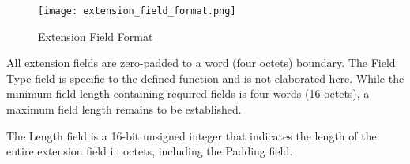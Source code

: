 \begin{figure}
\centering
\texttt{[image: extension\_field\_format.png]}
\caption{Extension Field Format}
\label{extension_field_format}
\end{figure}

All extension fields are zero-padded to a word (four octets)
boundary. The Field Type field is specific to the defined function
and is not elaborated here. While the minimum field length
containing required fields is four words (16 octets), a maximum field
length remains to be established.

The Length field is a 16-bit unsigned integer that indicates the
length of the entire extension field in octets, including the Padding
field.
